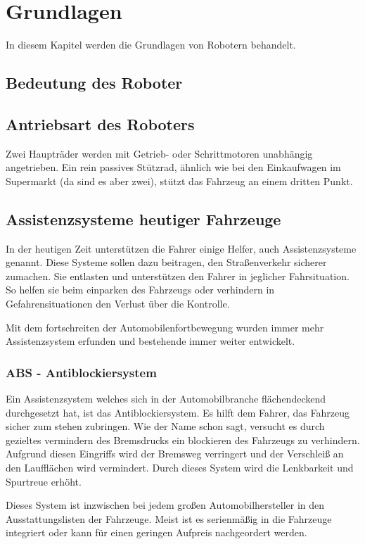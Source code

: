 \chapter{Grundlagen}
In diesem Kapitel werden die Grundlagen von Robotern behandelt.
\section{Bedeutung des Roboter}
\section{Antriebsart des Roboters}
Zwei Haupträder werden mit Getrieb- oder Schrittmotoren unabhängig angetrieben. Ein rein passives Stützrad, ähnlich wie bei den Einkaufwagen im Supermarkt (da sind es aber zwei), stützt das Fahrzeug an einem dritten Punkt.

\section{Assistenzsysteme heutiger Fahrzeuge}
In der heutigen Zeit unterstützen die Fahrer einige Helfer, auch Assistenzsysteme genannt. Diese Systeme sollen dazu beitragen, den Straßenverkehr sicherer zumachen. Sie entlasten und unterstützen den Fahrer in jeglicher Fahrsituation. So helfen sie beim einparken des Fahrzeugs oder verhindern in Gefahrensituationen den Verlust über die Kontrolle.

Mit dem fortschreiten der Automobilenfortbewegung wurden immer mehr Assistenzsystem erfunden und bestehende immer weiter entwickelt. 
\subsection{ABS - Antiblockiersystem}
Ein Assistenzsystem welches sich in der Automobilbranche flächendeckend durchgesetzt hat, ist das Antiblockiersystem. Es hilft dem Fahrer, das Fahrzeug sicher zum stehen zubringen. Wie der Name schon sagt, versucht es durch gezieltes vermindern des Bremsdrucks ein blockieren des Fahrzeugs zu verhindern. Aufgrund diesen Eingriffs wird der Bremsweg verringert und der Verschleiß an den Laufflächen wird vermindert. Durch dieses System wird die Lenkbarkeit und Spurtreue erhöht.

Dieses System ist inzwischen bei jedem großen Automobilhersteller in den Ausstattungslisten der Fahrzeuge. Meist ist es serienmäßig in die Fahrzeuge integriert oder kann für einen geringen Aufpreis nachgeordert werden. 

